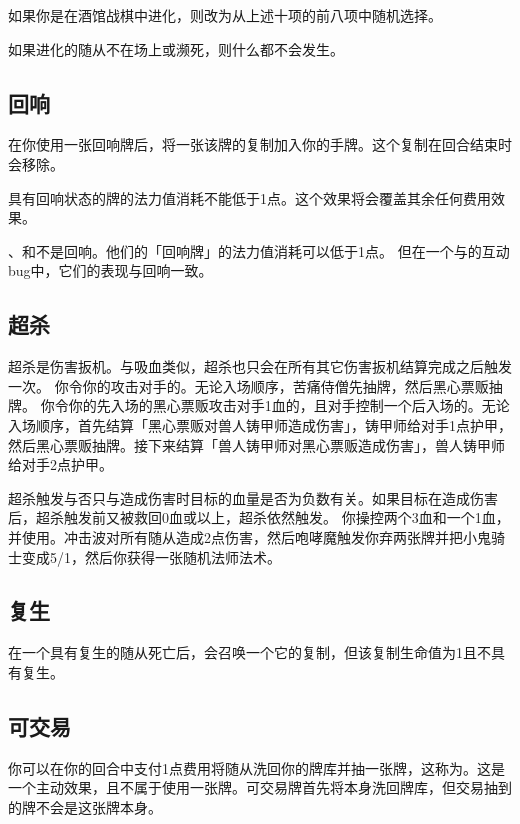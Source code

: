 如果你是在酒馆战棋中进化，则改为从上述十项的前八项中随机选择。

如果进化的随从不在场上或濒死，则什么都不会发生。

\subsection{回响}
\label{echo}

在你使用一张回响牌后，将一张该牌的复制加入你的手牌。这个复制在回合结束时会移除。

具有回响状态的牌的法力值消耗不能低于1点。这个效果将会覆盖其余任何费用效果。

、和不是回响。他们的「回响牌」的法力值消耗可以低于1点。
\notice 但在一个与的互动bug中，它们的表现与回响一致。

\subsection{超杀}
\label{overkill}

超杀是伤害扳机。与吸血类似，超杀也只会在所有其它伤害扳机结算完成之后触发一次。
\example 你令你的攻击对手的。无论入场顺序，苦痛侍僧先抽牌，然后黑心票贩抽牌。
\example 你令你的先入场的黑心票贩攻击对手1血的，且对手控制一个后入场的。无论入场顺序，首先结算「黑心票贩对兽人铸甲师造成伤害」，铸甲师给对手1点护甲，然后黑心票贩抽牌。接下来结算「兽人铸甲师对黑心票贩造成伤害」，兽人铸甲师给对手2点护甲。

超杀触发与否只与造成伤害时目标的血量是否为负数有关。如果目标在造成伤害后，超杀触发前又被救回0血或以上，超杀依然触发。
\example 你操控两个3血和一个1血，并使用。冲击波对所有随从造成2点伤害，然后咆哮魔触发你弃两张牌并把小鬼骑士变成5/1，然后你获得一张随机法师法术。

\subsection{复生}
\label{reborn}

在一个具有复生的随从死亡后，会召唤一个它的复制，但该复制生命值为1且不具有复生。

\subsection{可交易}
\label{tradeable}

你可以在你的回合中支付1点费用将随从洗回你的牌库并抽一张牌，这称为。这是一个主动效果，且不属于使用一张牌。可交易牌首先将本身洗回牌库，但交易抽到的牌不会是这张牌本身。

